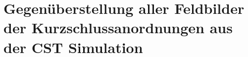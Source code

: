 \section{Gegen\"uberstellung aller Feldbilder der Kurzschlussanordnungen aus der CST Simulation}
\label{sec:allfieldplots}